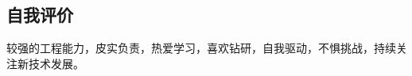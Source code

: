 \documentclass[line,margin,UTF8]{res}
\begin{document}
\begin{resume}



 \section{自我评价}
较强的工程能力，皮实负责，热爱学习，喜欢钻研，自我驱动，不惧挑战，持续关注新技术发展。

 
\end{resume}    
\end{document}
